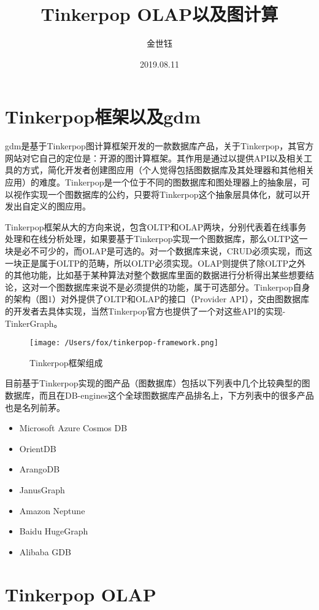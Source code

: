 \documentclass{article}
\title{Tinkerpop OLAP以及图计算}
\author{金世钰}
\date{2019.08.11}
\begin{document}
\maketitle
\section{Tinkerpop框架以及gdm}

gdm是基于Tinkerpop图计算框架开发的一款数据库产品，关于Tinkerpop，其官方网站对它自己的定位是：开源的图计算框架。其作用是通过以提供API以及相关工具的方式，简化开发者创建图应用（个人觉得包括图数据库及其处理器和其他相关应用）的难度。Tinkerpop是一个位于不同的图数据库和图处理器上的抽象层，可以视作实现一个图数据库的公约，只要将Tinkerpop这个抽象层具体化，就可以开发出自定义的图应用。

Tinkerpop框架从大的方向来说，包含OLTP和OLAP两块，分别代表着在线事务处理和在线分析处理，如果要基于Tinkerpop实现一个图数据库，那么OLTP这一块是必不可少的，而OLAP是可选的。对一个数据库来说，CRUD必须实现，而这一块正是属于OLTP的范畴，所以OLTP必须实现。OLAP则提供了除OLTP之外的其他功能，比如基于某种算法对整个数据库里面的数据进行分析得出某些想要结论，这对一个图数据库来说不是必须提供的功能，属于可选部分。Tinkerpop自身的架构（图1）对外提供了OLTP和OLAP的接口（Provider API），交由图数据库的开发者去具体实现，当然Tinkerpop官方也提供了一个对这些API的实现-TinkerGraph。
\begin{figure*}
    \centering
        \texttt{[image: /Users/fox/tinkerpop-framework.png]}
        \caption{Tinkerpop框架组成}
\end{figure*}

目前基于Tinkerpop实现的图产品（图数据库）包括以下列表中几个比较典型的图数据库，而且在DB-engines这个全球图数据库产品排名上，下方列表中的很多产品也是名列前茅。

\begin{itemize}

\item Microsoft Azure Cosmos DB
\item OrientDB
\item ArangoDB
\item JanusGraph
\item Amazon Neptune
\item Baidu HugeGraph
\item Alibaba GDB
\end{itemize}

\section{Tinkerpop OLAP}
\end{document}
